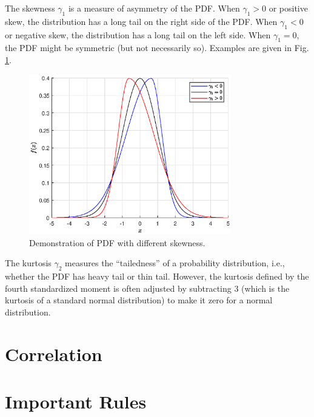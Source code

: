The skewness $\gamma_1$ is a measure of asymmetry of the PDF. When $\gamma_1 > 0$ or positive skew, the distribution has a long tail on the right side of the PDF. When $\gamma_1 <0$ or negative skew, the distribution has a long tail on the left side. When $\gamma_1 = 0$, the PDF might be symmetric (but not necessarily so). Examples are given in Fig. \ref{fig:skewness_demo}.
\begin{figure}
	\centering
	\includegraphics[width=250pt]{chapters/ch-measures-of-distribution/figures/skewness_demo.eps}
	\caption{Demonstration of PDF with different skewness.} \label{fig:skewness_demo}
\end{figure}

The kurtosis $\gamma_2$ measures the ``tailedness'' of a probability distribution, i.e., whether the PDF has heavy tail or thin tail. However, the kurtosis defined by the fourth standardized moment is often adjusted by subtracting 3 (which is the kurtosis of a standard normal distribution) to make it zero for a normal distribution.


\section{Correlation}


\section{Important Rules}



